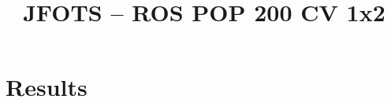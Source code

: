 \documentclass{llncs}
\title{JFOTS -- ROS POP 200 CV 1x2}
\begin{document}
\maketitle

\section{Results}
















\end{document}
